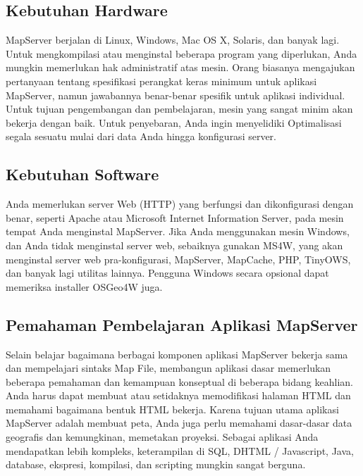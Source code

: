 \subsection{Kebutuhan Hardware}
MapServer berjalan di Linux, Windows, Mac OS X, Solaris, dan banyak lagi. Untuk mengkompilasi atau menginstal beberapa program yang diperlukan, Anda mungkin memerlukan hak administratif atas mesin. Orang biasanya mengajukan pertanyaan tentang spesifikasi perangkat keras minimum untuk aplikasi MapServer, namun jawabannya benar-benar spesifik untuk aplikasi individual. Untuk tujuan pengembangan dan pembelajaran, mesin yang sangat minim akan bekerja dengan baik. Untuk penyebaran, Anda ingin menyelidiki Optimalisasi segala sesuatu mulai dari data Anda hingga konfigurasi server.

\subsection{Kebutuhan Software}
Anda memerlukan server Web (HTTP) yang berfungsi dan dikonfigurasi dengan benar, seperti Apache atau Microsoft Internet Information Server, pada mesin tempat Anda menginstal MapServer.
Jika Anda menggunakan mesin Windows, dan Anda tidak menginstal server web, sebaiknya gunakan MS4W, yang akan menginstal server web pra-konfigurasi, MapServer, MapCache, PHP, TinyOWS, dan banyak lagi utilitas lainnya. Pengguna Windows secara opsional dapat memeriksa installer OSGeo4W juga.

\subsection{Pemahaman Pembelajaran Aplikasi MapServer}
Selain belajar bagaimana berbagai komponen aplikasi MapServer bekerja sama dan mempelajari sintaks Map File, membangun aplikasi dasar memerlukan beberapa pemahaman dan kemampuan konseptual di beberapa bidang keahlian.
Anda harus dapat membuat atau setidaknya memodifikasi halaman HTML dan memahami bagaimana bentuk HTML bekerja. Karena tujuan utama aplikasi MapServer adalah membuat peta, Anda juga perlu memahami dasar-dasar data geografis dan kemungkinan, memetakan proyeksi. Sebagai aplikasi Anda mendapatkan lebih kompleks, keterampilan di SQL, DHTML / Javascript, Java, database, ekspresi, kompilasi, dan scripting mungkin sangat berguna.

